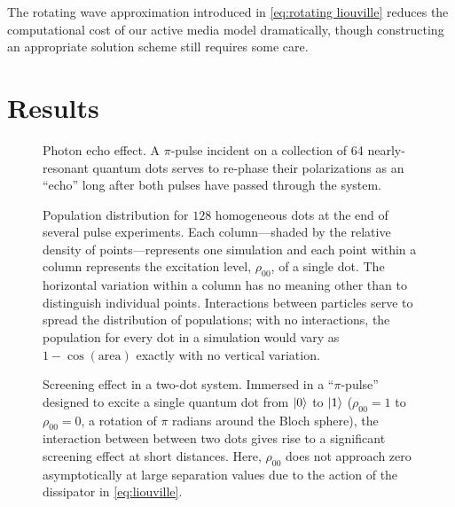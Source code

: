 \documentclass[conference]{IEEEtran}
\begin{document}
The rotating wave approximation introduced in \cref{eq:rotating liouville} reduces the computational cost of our active media model dramatically, though constructing an appropriate solution scheme still requires some care.


\section{Results}

\begin{figure}
  \centering
  
  \caption{\label{fig:echo} Photon echo effect.
    A $\pi$-pulse incident on a collection of 64 nearly-resonant quantum dots serves to re-phase their polarizations as an ``echo'' long after both pulses have passed through the system.
  }
\end{figure}

\begin{figure}
  \centering
  
  \caption{\label{fig:decoherence}
    Population distribution for $128$ homogeneous dots at the end of several pulse experiments.
    Each column---shaded by the relative density of points---represents one simulation and each point within a column represents the excitation level, $\rho_{00}$, of a single dot.
    The horizontal variation within a column has no meaning other than to distinguish individual points.
    Interactions between particles serve to spread the distribution of populations; with no interactions, the population for every dot in a simulation would vary as $1-\cos(\text{area})$ exactly with no vertical variation.
  }
\end{figure}

\begin{figure}
  \centering
  
  \caption{\label{fig:screening} Screening effect in a two-dot system.
  Immersed in a ``$\pi$-pulse'' designed to excite a single quantum dot from $\ket{0}$ to $\ket{1}$ ($\rho_{00} = 1$ to $\rho_{00} = 0$, a rotation of $\pi$ radians around the Bloch sphere), the interaction between between two dots gives rise to a significant screening effect at short distances.
  Here, $\rho_{00}$ does not approach zero asymptotically at large separation values due to the action of the dissipator in \cref{eq:liouville}.
  }
\end{figure}

{}

\end{document}
